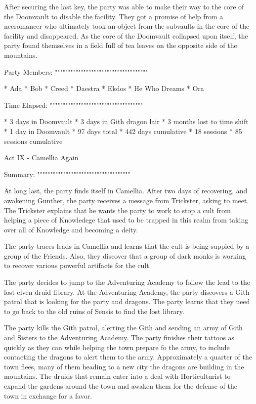After securing the last key, the party was able to make their way to the core of the Doomvault to disable the facility.
They got a promise of help from a necromancer who ultimately took an object from the subvaults in the core of the facility and disappeared.
As the core of the Doomvault collapsed upon itself, the party found themselves in a field full of tea leaves on the opposite side of the mountains.

Party Members:
""""""""""""""""""""""""""""""""""""

  * Ada
  * Bob
  * Creed
  * Daestra
  * Ekdos
  * He Who Dreams
  * Ora

Time Elapsed:
""""""""""""""""""""""""""""""""""""

  * 3 days in Doomvault
  * 3 days in Gith dragon lair
  * 3 months lost to time shift
  * 1 day in Doomvault
  * 97 days total
  * 442 days cumulative
  * 18 sessions
  * 85 sessions cumulative

Act IX - Camellia Again
^^^^^^^^^^^^^^^^^^^^^^^^^^^^^^^^^^^^

Summary:
""""""""""""""""""""""""""""""""""""

At long last, the party finds itself in Camellia.
After two days of recovering, and awakening Gunther, the party receives a message from Trickster, asking to meet.
The Trickster explains that he wants the party to work to stop a cult from helping a piece of Knowledege that used to be trapped in this realm from taking over all of Knowledge and becoming a deity.

The party traces leads in Camellia and learns that the cult is being suppied by a group of the Friends.
Also, they discover that a group of dark monks is working to recover various powerful artifacts for the cult.

The party decides to jump to the Adventuring Academy to follow the lead to the lost elven druid library.
At the Adventuring Academy, the party discovers a Gith patrol that is looking for the party and dragons.
The party learns that they need to go back to the old ruins of Sensis to find the lost library.

The party kills the Gith patrol, alerting the Gith and sending an army of Gith and Sisters to the Adventuring Academy.
The party finishes their tattoos as quickly as they can while helping the town prepare fo the army, to include contacting the dragons to alert them to the army.
Approximately a quarter of the town flees, many of them heading to a new city the dragons are building in the mountains.
The druids that remain enter into a deal with Horticulturist to expand the gardens around the town and awaken them for the defense of the town in exchange for a favor.

